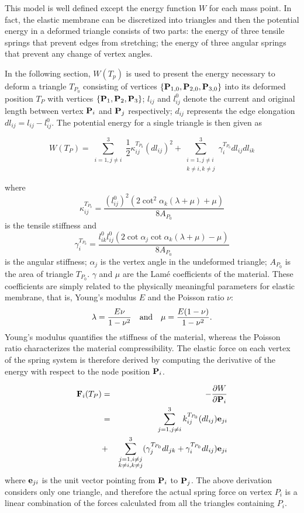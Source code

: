 This model is well defined except the energy function $W$ for each mass point. In fact, the elastic membrane can be discretized into triangles and then the potential energy in a deformed triangle consists of two parts: the energy of three tensile springs that prevent edges from stretching; the energy of three angular springs that prevent any change of vertex angles. 

In the following section, $W(T_p)$ is used to present the energy necessary to deform a triangle $T_{P_0}$ consisting of vertices $\{\mathbf{P}_{1,0}, \mathbf{P}_{2,0}, \mathbf{P}_{3,0}\}$ into  its deformed position $T_P$ with vertices $\{\mathbf{P}_{1}, \mathbf{P}_{2}, \mathbf{P}_{3}\}$; $l_{ij}$ and $l_{ij}^0$ denote the current and original length between vertex $\mathbf{P}_i$ and $\mathbf{P}_j$ respectively; $d_{ij}$ represents the edge elongation $dl_{ij} = l_{ij}-l_{ij}^0$. The potential energy for a single triangle is then given as \cite{Delingette2008Triangular} 

\[
W(T_{P})=\sum_{\substack{i=1, j \neq i}}^{3}\frac{1}{2}\kappa_{ij}^{T_{P_0}}
(dl_{ij})^{2}+\sum_{\substack{i=1, j \neq i \\ k \neq i, k \neq j}}^{3}\gamma_{i}^{T_{P_0}}dl_{ij}dl_{ik} 
\]

where \[
\kappa_{ij}^{T_{P_0}}=\frac{(l_{ij}^{0})^{2}(2\cot^{2}\alpha_{k}
(\lambda+\mu)+\mu)}{8A_{P_0}} \] 
is the tensile stiffness and
\begin{equation}
\gamma_{i}^{T_{P_0}}=\frac{l_{ik}^{0}l_{ij}^{0}(2\cot\alpha_{j}
\cot\alpha_{k}(\lambda+\mu)-\mu)}{8A_{P_0}} \label{eq:angular_stiff}
\end{equation} 
is the angular stiffness; $\alpha_j$ is the vertex angle in the undeformed triangle; $A_{P_0}$ is the area of triangle $T_{P_0}$. $\gamma$ and $\mu$ are the Lam\'{e}
coefficients of the material.  These coefficients are simply related to the
physically meaningful parameters for elastic membrane,
that is, Young's modulus $E$ and the Poisson ratio $\nu$:
$$\lambda=\frac{E\nu}{1-\nu^{2}} ~~~{\rm and}~~~
\mu=\frac{E(1-\nu)}{1-\nu^{2}}.$$ 
Young's modulus quantifies the stiffness of
the material, whereas the Poisson ratio characterizes the material
compressibility. The elastic force on each vertex of the spring system is
therefore derived by computing the derivative of the energy with respect 
to the node position $\mathbf{P}_i$.

\begin{eqnarray} 
\mathbf{F}_i(T_{P}) & = & -\frac{\partial W}{\partial \mathbf{P}_i}\\
& = & \sum_{j = 1, j \neq i}^3 k^{T_{P_0}}_{ij}(dl_{ij})\mathbf{e}_{ji} \\
& + & \sum_{\substack{j=1, i\neq j \\ k \neq i, k \neq j}}^3
(\gamma_j^{T_{P_0}} dl_{jk} + \gamma_i^{T_{P_0}} dl_{ij}) \mathbf{e}_{ji}
\label{eq:v_force} 
\end{eqnarray} 
where $\mathbf{e}_{ji}$ is the unit vector pointing from $\mathbf{P}_i$ to $\mathbf{P}_j$.
The above derivation considers only one triangle, and therefore the actual spring force on vertex $P_i$ is a linear combination of the forces calculated from all the triangles containing $P_i$. 

